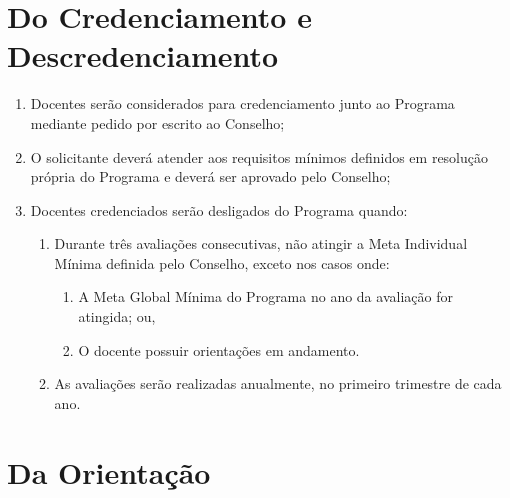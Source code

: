 \documentclass{article}
\newcommand{\grupoMaior}{Conselho\xspace}
\begin{document}
\section{Do Credenciamento e Descredenciamento}
\begin{enumerate}
	\item Docentes serão considerados para credenciamento junto ao Programa mediante pedido por escrito ao \grupoMaior;

	\item O solicitante deverá atender aos requisitos mínimos definidos em resolução própria do Programa e deverá ser aprovado pelo \grupoMaior;

	\item Docentes credenciados serão desligados do Programa quando:
	\begin{enumerate}
		\item Durante três avaliações consecutivas, não atingir a Meta Individual Mínima definida pelo \grupoMaior, exceto nos casos onde:
		\begin{enumerate}
			\item A Meta Global Mínima do Programa no ano da avaliação for atingida; ou,
			\item O docente possuir orientações em andamento.
		\end{enumerate}

		\item As avaliações serão realizadas anualmente, no primeiro trimestre de cada ano.
	\end{enumerate}

\end{enumerate}


\section{Da Orientação}
\end{document}
